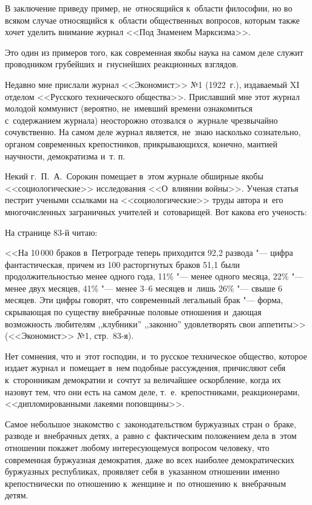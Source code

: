В заключение приведу пример, не~относящийся к~области философии, но во всяком случае относящийся к~области общественных вопросов, которым также хочет уделить внимание журнал <<Под Знаменем Марксизма>>.

Это один из примеров того, как современная якобы наука на самом деле служит проводником грубейших и~гнуснейших реакционных взглядов.

Недавно мне прислали журнал <<Экономист>> №1 (1922~г.), издаваемый XI отделом <<Русского технического общества>>. Приславший мне этот журнал молодой коммунист (вероятно, не~имевший времени ознакомиться с~содержанием журнала) неосторожно отозвался о~журнале чрезвычайно сочувственно. На самом деле журнал является, не~знаю насколько сознательно, органом современных крепостников, прикрывающихся, конечно, мантией научности, демократизма и~т. п.

Некий г.~П.~А.~Сорокин помещает в~этом журнале обширные якобы <<социологические>> исследования <<О~влиянии войны>>. Ученая статья пестрит учеными ссылками на <<социологические>> труды автора и~его многочисленных заграничных учителей и~сотоварищей. Вот какова его ученость:

На странице 83-й читаю:

<<На 10\,000 браков в~Петрограде теперь приходится 92{,}2 развода "--- цифра фантастическая, причем из 100 расторгнутых браков 51{,}1 были продолжительностью менее одного года, 11\% "--- менее одного месяца, 22\% "--- менее двух месяцев, 41\% "--- менее 3--6 месяцев и~лишь 26\% "--- свыше 6 месяцев. Эти цифры говорят, что современный легальный брак "--- форма, скрывающая по существу внебрачные половые отношения и~дающая возможность любителям ,,клубники'' ,,законно'' удовлетворять свои аппетиты>> (<<Экономист>> №1, стр.~83-я).

Нет сомнения, что и~этот господин, и~то русское техническое общество, которое издает журнал и~помещает в~нем подобные рассуждения, причисляют себя к~сторонникам демократии и~сочтут за величайшее оскорбление, когда их назовут тем, что они есть на самом деле, т.~е.~крепостниками, реакционерами, <<дипломированными лакеями поповщины>>.

Самое небольшое знакомство с~законодательством буржуазных стран о~браке, разводе и~внебрачных детях, а~равно с~фактическим положением дела в~этом отношении покажет любому интересующемуся вопросом человеку, что современная буржуазная демократия, даже во всех наиболее демократических буржуазных республиках, проявляет себя в~указанном отношении именно крепостнически по отношению к~женщине и~по отношению к~внебрачным детям.

